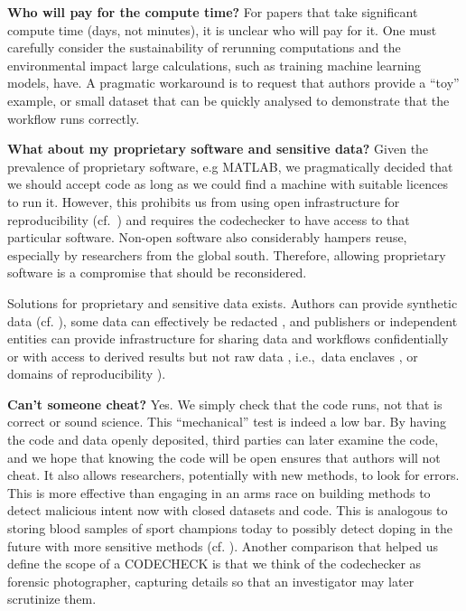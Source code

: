 \documentclass[12pt]{article}
\begin{document}
\textbf{Who will pay for the compute time?}  For papers that take
significant compute time (days, not minutes), it is unclear who will
pay for it. One must carefully consider the sustainability of
rerunning computations and the environmental impact large
calculations, such as training machine learning models, have.  A
pragmatic workaround is to request that authors provide a ``toy''
example, or small dataset that can be quickly analysed to demonstrate
that the workflow runs correctly.

\textbf{What about my proprietary software and sensitive data?}  Given
the prevalence of proprietary software, e.g MATLAB, we pragmatically
decided that we should accept code as long as we could find a machine
with suitable licences to run it.  However, this prohibits us from
using open infrastructure for reproducibility
(cf.~\cite{konkol_publishing_2020,perkel_make_2019}) and requires the
codechecker to have access to that particular software.  Non-open
software also considerably hampers reuse, especially by researchers
from the global south. Therefore, allowing proprietary software is a
compromise that should be reconsidered.

Solutions for proprietary and sensitive data exists.  Authors can
provide synthetic data (cf. \cite{shannon_opening_2018}), some data
can effectively be redacted \cite{oloughlin_data_2015}, and publishers
or independent entities can provide infrastructure for sharing data
and workflows confidentially \cite{perignon_certify_2019} or with
access to derived results but not raw data
\cite{shannon_opening_2018}, i.e.,~data enclaves
\cite{foster_research_2018}, or domains of reproducibility
\cite{harris_more_2017}).

\textbf{Can't someone cheat?} Yes. We simply check that the code runs,
not that is correct or sound science. This ``mechanical'' test is
indeed a low bar.  By having the code and data openly deposited, third
parties can later examine the code, and we hope that knowing the code
will be open ensures that authors will not cheat.  It also allows
researchers, potentially with new methods, to look for errors.  This
is more effective than engaging in an arms race on building methods to
detect malicious intent now with closed datasets and code.  This is
analogous to storing blood samples of sport champions today to
possibly detect doping in the future with more sensitive methods
(cf. \cite{everythinghertz97}).  Another comparison that helped us
define the scope of a CODECHECK is that we think of the codechecker as
forensic photographer, capturing details so that an investigator may
later scrutinize them.
\end{document}
